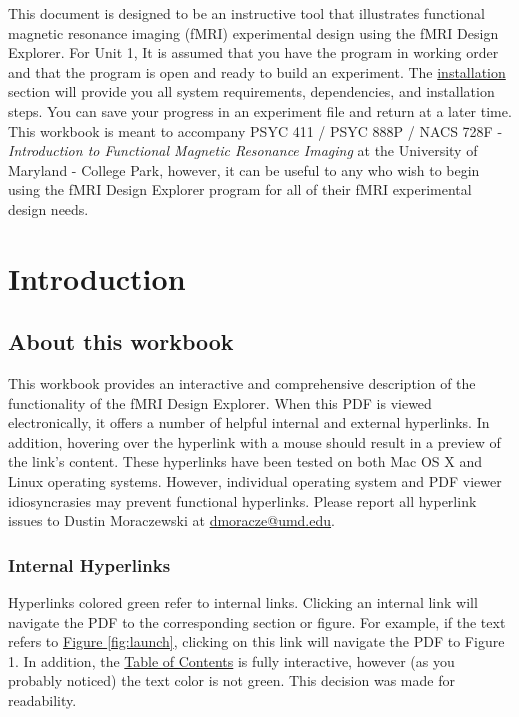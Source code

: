 \documentclass[10pt]{article}
\begin{document}
	This document is designed to be an instructive tool that illustrates functional magnetic resonance imaging (fMRI) experimental design using the fMRI Design Explorer. 
	For Unit 1, It is assumed that you have the program in working order and that the program is open and ready to build an experiment.
	The \hyperref[sec:install]{installation} section will provide you all system requirements, dependencies, and installation steps.
	You can save your progress in an experiment file and return at a later time.
	This workbook is meant to accompany PSYC 411 / PSYC 888P / NACS 728F - \textit{Introduction to Functional Magnetic Resonance Imaging} at the University of Maryland - College Park, however, it can be useful to any who wish to begin using the fMRI Design Explorer program for all of their fMRI experimental design needs. 
	
	
\newpage


\hypersetup{
	linkcolor=PineGreen,
	urlcolor=RoyalBlue
	}
\section{Introduction}
\label{sec:into}
	\subsection*{About this workbook}
	\label{subsec:intro.manu}
		This workbook provides an interactive and comprehensive description of the functionality of the fMRI Design Explorer.
		When this PDF is viewed electronically, it offers a number of helpful internal and external hyperlinks.
		In addition, hovering over the hyperlink with a mouse should result in a preview of the link's content.
		These hyperlinks have been tested on both Mac OS X and Linux operating systems.
		However, individual operating system and PDF viewer idiosyncrasies may prevent functional hyperlinks.
		Please report all hyperlink issues to Dustin Moraczewski at \href{mailto:dmoracze@umd.edu}{dmoracze@umd.edu}.

		\subsubsection*{Internal Hyperlinks}
		\label{subsubsec:internal}
			Hyperlinks colored \textcolor{PineGreen}{green} refer to internal links.
			Clicking an internal link will navigate the PDF to the corresponding section or figure.
			For example, if the text refers to \hyperref[fig:launch]{Figure \ref{fig:launch}}, clicking on this link will navigate the PDF to Figure 1.
			In addition, the \hyperref[sec:toc]{Table of Contents} is fully interactive, however (as you probably noticed) the text color is not \textcolor{PineGreen}{green}.
			This decision was made for readability.
\end{document}

